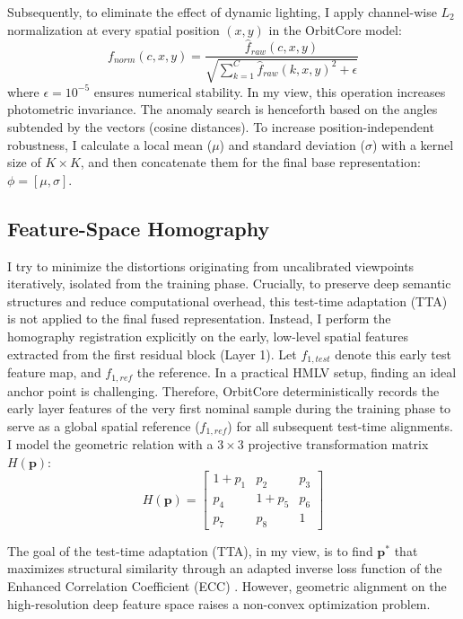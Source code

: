 \documentclass{article}
\begin{document}
	Subsequently, to eliminate the effect of dynamic lighting, I apply channel-wise $L_2$ normalization at every spatial position $(x, y)$ in the OrbitCore model:
	\begin{equation}
		f_{norm}(c, x, y) = \frac{\hat{f}_{raw}(c, x, y)}{\sqrt{\sum_{k=1}^C \hat{f}_{raw}(k, x, y)^2 + \epsilon}}
	\end{equation}
	where $\epsilon = 10^{-5}$ ensures numerical stability. In my view, this operation increases photometric invariance. The anomaly search is henceforth based on the angles subtended by the vectors (cosine distances). To increase position-independent robustness, I calculate a local mean ($\mu$) and standard deviation ($\sigma$) with a kernel size of $K \times K$, and then concatenate them for the final base representation: $\phi = [\mu, \sigma]$.
	
	\subsection{Feature-Space Homography}
	\label{subsec:homography}
	I try to minimize the distortions originating from uncalibrated viewpoints iteratively, isolated from the training phase. Crucially, to preserve deep semantic structures and reduce computational overhead, this test-time adaptation (TTA) is not applied to the final fused representation. Instead, I perform the homography registration explicitly on the early, low-level spatial features extracted from the first residual block (Layer 1). Let $f_{1, test}$ denote this early test feature map, and $f_{1, ref}$ the reference. In a practical HMLV setup, finding an ideal anchor point is challenging. Therefore, OrbitCore deterministically records the early layer features of the very first nominal sample during the training phase to serve as a global spatial reference ($f_{1, ref}$) for all subsequent test-time alignments. I model the geometric relation with a $3 \times 3$ projective transformation matrix $H(\mathbf{p})$:
	\begin{equation}
		H(\mathbf{p}) = \begin{bmatrix} 1 + p_1 & p_2 & p_3 \\ p_4 & 1 + p_5 & p_6 \\ p_7 & p_8 & 1 \end{bmatrix}
	\end{equation}
	
	The goal of the test-time adaptation (TTA), in my view, is to find $\mathbf{p}^*$ that maximizes structural similarity through an adapted inverse loss function of the Enhanced Correlation Coefficient (ECC) \cite{Evangelidis2008}. However, geometric alignment on the high-resolution deep feature space raises a non-convex optimization problem.
	
\end{document}
